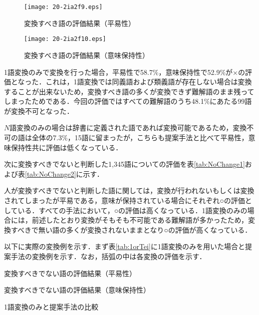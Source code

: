 \documentclass[japanese]{jnlp_1.4}
\begin{document}
\begin{figure}[t]
 \begin{center}
  \texttt{[image: 20-2ia2f9.eps]}
 \end{center}
 \caption{変換すべき語の評価結果（平易性）}
 \label{fig:hyouka1H}
\end{figure}
\begin{figure}[t]
 \begin{center}
  \texttt{[image: 20-2ia2f10.eps]}
 \end{center}
 \caption{変換すべき語の評価結果（意味保持性）}
 \label{fig:hyouka1I}
\end{figure}

1語変換のみで変換を行った場合，平易性で58.7\%，意味保持性で52.9\%が×の評価となった．これは，1語変換では同義語および類義語が存在しない場合は変換することが出来ないため，変換すべき語の多くが変換できず難解語のまま残ってしまったためである．今回の評価ではすべての難解語のうち48.1\%にあたる99語が変換不可となった．

$N$語変換のみの場合は辞書に定義された語であれば変換可能であるため，変換不可の語は全体の7.3\%，15語に留まったが，こちらも提案手法と比べて平易性，意味保持性共に評価は低くなっている．


次に変換すべきでないと判断した1,345語についての評価を表\ref{tab:NoChange1}および表\ref{tab:NoChange2}に示す．

人が変換すべきでないと判断した語に関しては，変換が行われないもしくは変換されてしまったが平易である，意味が保持されている場合にそれぞれ○の評価としている．すべての手法において，○の評価は高くなっている．1語変換のみの場合には，前述したとおり変換がそもそも不可能である難解語が多かったため，変換すべきで無い語の多くが変換されないままとなり○の評価が高くなっている．

以下に実際の変換例を示す．まず表\ref{tab:1orTei}に1語変換のみを用いた場合と提案手法の変換例を示す．なお，括弧の中は各変換の評価を示す．

\begin{table}[t]
\caption{変換すべきでない語の評価結果（平易性）}
\label{tab:NoChange1}

\end{table}
\begin{table}[t]
\caption{変換すべきでない語の評価結果（意味保持性）}
\label{tab:NoChange2}

\end{table}
\begin{table}[t]
\caption{1語変換のみと提案手法の比較}
\label{tab:1orTei}

\end{table}
\end{document}
